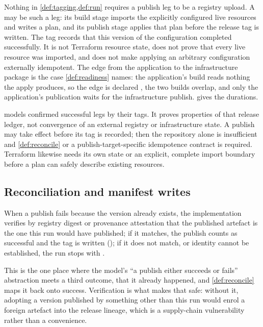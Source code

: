 \begin{example}
\label{ex:terraform}
Nothing in \cref{def:tagging,def:run} requires a publish leg to be a registry
upload. A  may be such a leg: its build stage imports the
explicitly configured live resources and writes a plan, and its publish stage
applies that plan before the release tag is written. The tag records that this
version of the configuration completed successfully. It is not Terraform
resource state, does not prove that every live resource was imported, and does
not make applying an arbitrary configuration externally idempotent. The edge
from the application to the infrastructure package is the case
\cref{def:readiness} names: the application's build reads nothing the apply
produces, so the edge is declared , the two builds overlap, and
only the application's publication waits for the infrastructure publish.
 gives the durations.
\end{example}

\begin{remark}
 models confirmed successful legs by their tags. It proves
properties of that release ledger, not convergence of an external registry or
infrastructure state. A publish may take effect before its tag is recorded;
then the repository alone is insufficient and \cref{def:reconcile} or a
publish-target-specific idempotence contract is required. Terraform likewise
needs its own state or an explicit, complete import boundary before a plan can
safely describe existing resources.
\end{remark}

\subsection{Reconciliation and manifest writes}

\begin{definition}
\label{def:reconcile}
When a publish fails because the version already exists, the implementation
verifies by registry digest or provenance attestation that the published
artefact is the one this run would have published; if it matches, the publish
counts as successful and the tag is written (); if it does not
match, or identity cannot be established, the run stops with .
\end{definition}

This is the one place where the model's ``a publish either succeeds or fails''
abstraction meets a third outcome, that it already happened, and
\cref{def:reconcile} maps it back onto success. Verification is what makes that
safe: without it, adopting a version published by something other than this run
would enrol a foreign artefact into the release lineage, which is a
supply-chain vulnerability rather than a convenience.

